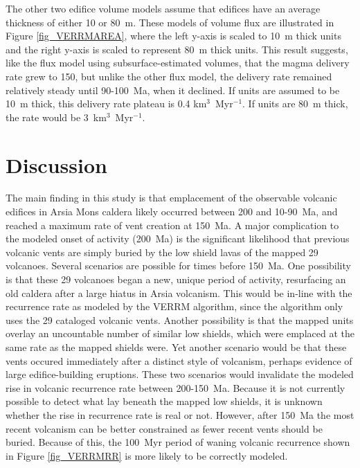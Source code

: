 The other two edifice volume models assume that edifices have an average thickness of either 10 or 80~m. These models of volume flux are illustrated in Figure \ref{fig_VERRMAREA}, where the left y-axis is scaled to 10~m thick units and the right y-axis is scaled to represent 80~m thick units. This result suggests, like the flux model using subsurface-estimated volumes, that the  magma delivery rate grew to 150, but unlike the other flux model, the delivery rate remained relatively steady until 90-100~Ma, when it declined. If units are assumed to be 10~m thick, this delivery rate plateau is 0.4 km$^3$~Myr$^{-1}$. If units are 80~m thick, the rate would be 3~km$^3$~Myr$^{-1}$.


\section{Discussion}
The main finding in this study is that emplacement of the observable volcanic edifices in Arsia Mons caldera likely occurred between 200 and 10-90~Ma, and reached a maximum rate of vent creation at 150~Ma. A major complication to the modeled onset of activity (200~Ma) is the significant likelihood that previous volcanic vents are simply buried by the low shield lavas of the mapped 29 volcanoes. Several scenarios are possible for times before 150~Ma. One possibility is that these 29 volcanoes began a new, unique period of activity, resurfacing an old caldera after a large hiatus in Arsia volcanism. This would be in-line with the recurrence rate as modeled by the VERRM algorithm, since the algorithm only uses the 29 cataloged volcanic vents. Another possibility is that the mapped units overlay an uncountable number of similar low shields, which were emplaced at the same rate as the mapped shields were. Yet another scenario would be that these vents occured immediately after a distinct style of volcanism, perhaps evidence of large edifice-building eruptions. These two scenarios would invalidate the modeled rise in volcanic recurrence rate between 200-150~Ma. Because it is not currently possible to detect what lay beneath the mapped low shields, it is unknown whether the rise in recurrence rate is real or not. However, after 150~Ma the most recent volcanism can be better constrained as fewer recent vents should be buried. Because of this, the 100~Myr period of waning volcanic recurrence shown in Figure \ref{fig_VERRMRR} is more likely to be correctly modeled.

